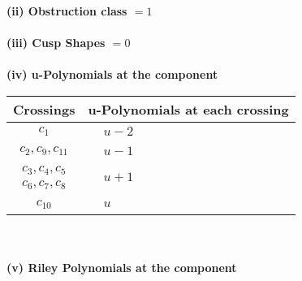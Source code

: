 \documentclass[1p]{elsarticle_modified}
\theoremstyle{definition}
\begin{document}
\flushleft \textbf{(ii) Obstruction class $= 1$}\\~\\
\flushleft \textbf{(iii) Cusp Shapes $= 0$}\\~\\
\newpage\renewcommand{\arraystretch}{1}
\flushleft \textbf{(iv) u-Polynomials at the component}\newline \\
\begin{tabular}{m{50pt}|m{274pt}}
Crossings & \hspace{64pt}u-Polynomials at each crossing \\
\hline $$\begin{aligned}c_{1}\end{aligned}$$&$\begin{aligned}
&u-2
\end{aligned}$\\
\hline $$\begin{aligned}c_{2},c_{9},c_{11}\end{aligned}$$&$\begin{aligned}
&u-1
\end{aligned}$\\
\hline $$\begin{aligned}c_{3},c_{4},c_{5}\\c_{6},c_{7},c_{8}\end{aligned}$$&$\begin{aligned}
&u+1
\end{aligned}$\\
\hline $$\begin{aligned}c_{10}\end{aligned}$$&$\begin{aligned}
&u
\end{aligned}$\\
\hline
\end{tabular}\\~\\
\newpage\renewcommand{\arraystretch}{1}
\flushleft \textbf{(v) Riley Polynomials at the component}\newline \\
\end{document}
